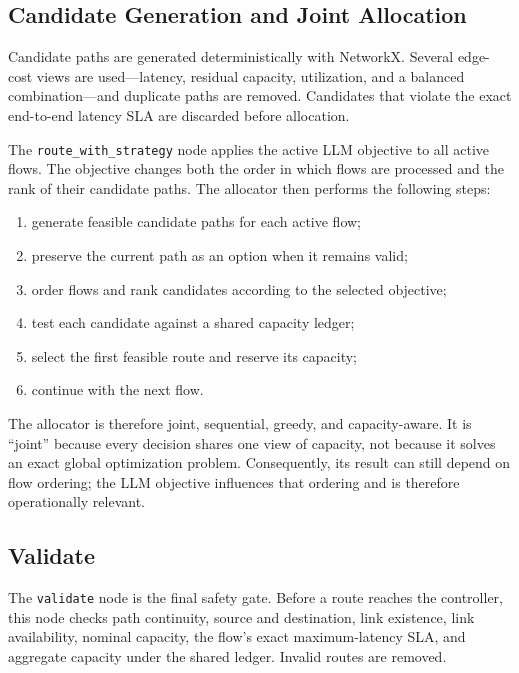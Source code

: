 \subsection{Candidate Generation and Joint Allocation}

Candidate paths are generated deterministically with NetworkX. Several edge-cost views
are used---latency, residual capacity, utilization, and a balanced combination---and
duplicate paths are removed. Candidates that violate the exact end-to-end latency SLA
are discarded before allocation.

The \texttt{route\_with\_strategy} node applies the active LLM objective to all active
flows. The objective changes both the order in which flows are processed and the rank
of their candidate paths. The allocator then performs the following steps:

\begin{enumerate}
    \item generate feasible candidate paths for each active flow;
    \item preserve the current path as an option when it remains valid;
    \item order flows and rank candidates according to the selected objective;
    \item test each candidate against a shared capacity ledger;
    \item select the first feasible route and reserve its capacity;
    \item continue with the next flow.
\end{enumerate}

The allocator is therefore joint, sequential, greedy, and capacity-aware. It is
``joint'' because every decision shares one view of capacity, not because it solves an
exact global optimization problem. Consequently, its result can still depend on flow
ordering; the LLM objective influences that ordering and is therefore operationally
relevant.

\subsection{Validate}

The \texttt{validate} node is the final safety gate. Before a route reaches the
controller, this node checks path continuity, source and destination, link existence,
link availability, nominal capacity, the flow's exact maximum-latency SLA, and aggregate
capacity under the shared ledger. Invalid routes are removed.

